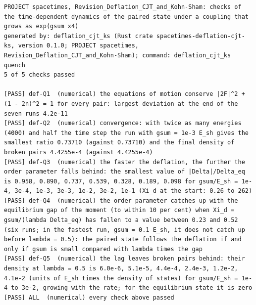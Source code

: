 \documentclass[
  10pt,
]{article}
\begin{document}
\begin{verbatim}
PROJECT spacetimes, Revision_Deflation_CJT_and_Kohn-Sham: checks of the time-dependent dynamics of the paired state under a coupling that grows as exp(gsum x4)
generated by: deflation_cjt_ks (Rust crate spacetimes-deflation-cjt-ks, version 0.1.0; PROJECT spacetimes, Revision_Deflation_CJT_and_Kohn-Sham); command: deflation_cjt_ks quench
5 of 5 checks passed

[PASS] def-Q1  (numerical) the equations of motion conserve |2F|^2 + (1 - 2n)^2 = 1 for every pair: largest deviation at the end of the seven runs 4.2e-11
[PASS] def-Q2  (numerical) convergence: with twice as many energies (4000) and half the time step the run with gsum = 1e-3 E_sh gives the smallest ratio 0.73710 (against 0.73710) and the final density of broken pairs 4.4255e-4 (against 4.4255e-4)
[PASS] def-Q3  (numerical) the faster the deflation, the further the order parameter falls behind: the smallest value of |Delta|/Delta_eq is 0.958, 0.890, 0.737, 0.539, 0.328, 0.189, 0.098 for gsum/E_sh = 1e-4, 3e-4, 1e-3, 3e-3, 1e-2, 3e-2, 1e-1 (Xi_d at the start: 0.26 to 262)
[PASS] def-Q4  (numerical) the order parameter catches up with the equilibrium gap of the moment (to within 10 per cent) when Xi_d = gsum/(lambda Delta_eq) has fallen to a value between 0.23 and 0.52 (six runs; in the fastest run, gsum = 0.1 E_sh, it does not catch up before lambda = 0.5): the paired state follows the deflation if and only if gsum is small compared with lambda times the gap
[PASS] def-Q5  (numerical) the lag leaves broken pairs behind: their density at lambda = 0.5 is 6.0e-6, 5.1e-5, 4.4e-4, 2.4e-3, 1.2e-2, 4.1e-2 (units of E_sh times the density of states) for gsum/E_sh = 1e-4 to 3e-2, growing with the rate; for the equilibrium state it is zero
[PASS] ALL  (numerical) every check above passed
\end{verbatim}
\end{document}
